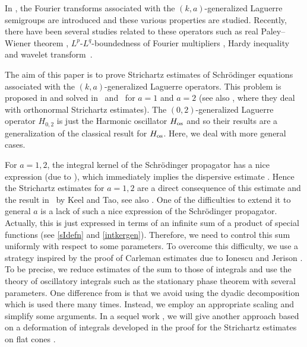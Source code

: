 \documentclass[pdftex]{sigma}
\numberwithin{equation}{section}
\begin{document}
In \cite{BKO}, the Fourier transforms associated with the $(k,a)$-generalized Laguerre semigroups are introduced and these various properties are studied. Recently, there have been several studies related to these operators such as real Paley--Wiener theorem \cite{LLF}, $L^p$-$L^q$-boundedness of Fourier multipliers \cite{KR}, Hardy inequality \cite{Te} and wavelet transform~\cite{BMMS}.

The aim of this paper is to prove Strichartz estimates of Schr\"odinger equations associated with the $(k,a)$-generalized Laguerre operators. This problem is proposed in \cite{BKO} and solved in~\cite{B} and~\cite{M} for $a=1$ and $a=2$ (see also \cite{MS}, where they deal with orthonormal Strichartz estimates). The $(0,2)$-generalized Laguerre operator $H_{0,2}$ is just the Harmonic oscillator $H_{\rm os}$ and so their results are a generalization of the classical result for $H_{\rm os}$. Here, we deal with more general cases.

For $a=1,2$, the integral kernel of the Schr\"odinger propagator has a nice expression (due to \cite[formula~(4.58)]{BKO}), which immediately implies the dispersive estimate \cite[Proposition 4.26]{BKO}. Hence the Strichartz estimates for $a=1,2$ are a direct consequence of this estimate and the result in~\cite{KT} by Keel and Tao, see also \cite{B,MS}. One of the difficulties to extend it to general $a$ is a lack of such a nice expression of the Schr\"odinger propagator. Actually, this is just expressed in terms of an infinite sum of a product of special functions (see \eqref{sIdefn} and \eqref{intkergen}). Therefore, we need to control this sum uniformly with respect to some parameters.
To overcome this difficulty, we use a strategy inspired by the proof of Carleman estimates due to Ionescu and Jerison \cite{IJ}. To be precise, we reduce estimates of the sum to those of integrals and use the theory of oscillatory integrals such as the stationary phase theorem with several parameters. One difference from \cite{IJ} is that we avoid using the dyadic decomposition which is used there many times. Instead, we employ an appropriate scaling and simplify some arguments.
In a sequel work \cite{TT}, we will give another approach based on a deformation of integrals developed in the proof for the Strichartz estimates on flat cones \cite{F}.
\end{document}
